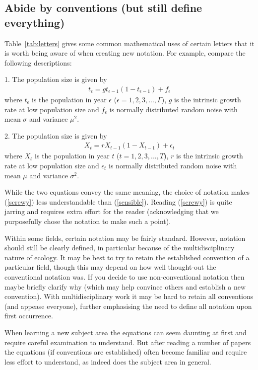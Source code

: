 \documentclass[12pt]{article}
\newcommand{\eb}{\begin{eqnarray}}
\newcommand{\ee}{\end{eqnarray}}
\begin{document}
\subsection*{Abide by conventions (but still define everything)}

Table~\ref{tab:letters} gives some common mathematical uses of certain letters
that it is worth being aware of when creating new notation. 
For example, compare the following descriptions:

1. The population size is given by 
\eb
t_\epsilon = g t_{\epsilon-1} (1 - t_{\epsilon-1}) + f_\epsilon
\label{screwy}
\ee
where $t_\epsilon$ is the population in year 
$\epsilon$ ($\epsilon = 1, 2, 3, ..., \Gamma$), $g$ is the
intrinsic growth rate at low population size
and $f_\epsilon$ is normally distributed random noise with mean $\sigma$ and 
variance $\mu^2$.

2. The population size is given by 
\eb
X_t = r X_{t-1} (1 - X_{t-1}) + \epsilon_t
\label{sensible}
\ee
where $X_t$ is the population in year $t$ ($t = 1, 2, 3, ..., T$), $r$ is the
intrinsic growth rate at low population size
and $\epsilon_t$ is normally distributed random noise with mean $\mu$ and 
variance $\sigma^2$.

While the two equations convey the same meaning, the choice of notation 
makes (\ref{screwy}) less understandable than (\ref{sensible}).
Reading (\ref{screwy}) is quite jarring and requires extra effort for 
the reader (acknowledging that we purposefully chose the notation
to make such a point). 

Within some fields, certain notation may be fairly standard. However, 
notation should still be clearly defined, in particular because
of the multidisciplinary nature of ecology.
It may be best to try to retain the established convention of a 
particular field, though this may depend on how well thought-out the 
conventional notation was. If you decide to use non-conventional notation
then maybe briefly clarify why (which may help convince others and establish
a new convention). With multidisciplinary work it may be hard to retain all
conventions (and appease everyone), further emphasising the need to define 
all notation upon first occurrence.

When learning a new subject area the equations can seem
daunting at first and require careful examination to understand. 
But after reading a number of papers the equations (if
conventions are established) often become familiar and require less effort to 
understand, as indeed does the subject area in general.
\end{document}

